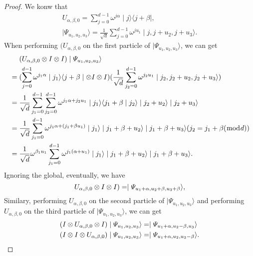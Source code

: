 \documentclass[pdflatex,sn-mathphys]{sn-jnl}%
\theoremstyle{thmstyleone}%
\theoremstyle{thmstyletwo}%
\theoremstyle{thmstylethree}%
\begin{document}
\begin{proof}
    We konw that
\begin{gather*}
U_{{\alpha},{\beta},{0}}=\sum_{j=0}^{d-1} \omega^{j{\alpha}}\mid{j}\rangle\langle{j+\beta}\mid, \\
\mid\varPsi_{{u_1},{u_2},{u_3}}\rangle=\frac{1}{\sqrt{d}}\sum_{j=0}^{d-1} \omega^{j{u_1}}\mid{j,j+{u_2,j+u_3}}\rangle.
\end{gather*}
When performing $(U_{{\alpha},{\beta},{0}}$ on the first particle of $\mid\varPsi_{{u_1},{u_2},{u_3}}\rangle$, we can get 
\begin{align}
&\mathrel{\phantom{=}}
    (U_{{\alpha},{\beta},{0}}\otimes I \otimes I)\mid\varPsi_{{u_1},{u_2},{u_3}}\rangle \notag \\
&=(\sum_{j=0}^{d-1} \omega^{j_1{\alpha}}\mid{j_1}\rangle\langle{j+\beta}\mid\otimes I \otimes I)(\frac{1}{\sqrt{d}}\sum_{j_2=0}^{d-1} \omega^{{j_2}{u_1}}\mid{j_2,j_2+u_2,j_2+u_3}\rangle) \notag \\
&=\frac{1}{\sqrt{d}}\sum_{j_1=0}^{d-1}\sum_{j_2=0}^{d-1}\omega^{{j_1}\alpha+{j_2}{u_1}}\mid{j_1}\rangle\langle{j_1+\beta}\mid{j_2}\rangle\mid{j_2+u_2}\rangle\mid{j_2+u_3}\rangle \notag \\
&=\frac{1}{\sqrt{d}}\sum_{j_1=0}^{d-1}\omega^{{j_1}\alpha+({j_1+\beta}{u_1})}\mid{j_1}\rangle\mid{j_1+\beta+u_2}\rangle\mid{j_1+\beta+u_3}\rangle (j_2=j_1+\beta (\bmod{d}))\notag \\
&=\frac{1}{\sqrt{d}} \omega^{{\beta_1}{u_1}}\sum_{j_1=0}^{d-1}\omega^{{j_1}(\alpha+{u_1})}\mid{j_1}\rangle\mid{j_1+\beta+u_2}\rangle\mid{j_1+\beta+u_3}\rangle. \notag
\end{align} 
Ignoring the global, eventually, we have
\begin{equation}
U_{{\alpha},{\beta},{0}}\otimes I \otimes I) =\mid\varPsi_{{u_1+\alpha},{u_2+\beta},{u_3+\beta}}\rangle, \notag
\end{equation}
Similary, performing $U_{{\alpha},{\beta},{0}}$ on the second particle of $\mid\varPsi_{{u_1},{u_2},{u_3}}\rangle$ and performing $U_{{\alpha},{\beta},{0}}$ on the third particle of $\mid\varPsi_{{u_1},{u_2},{u_3}}\rangle$, we can get
\begin{align}
    (I \otimes U_{{\alpha},{\beta},{0}} \otimes I)\mid\varPsi_{{u_1},{u_2},{u_3}}\rangle &=\mid\varPsi_{{u_1+\alpha},{u_2-\beta},{u_3}}\rangle \notag\\
    (I \otimes I \otimes U_{{\alpha},{\beta},{0}})\mid\varPsi_{{u_1},{u_2},{u_3}}\rangle &=\mid\varPsi_{{u_1+\alpha},{u_2},{u_3-\beta}}\rangle. \notag
\end{align} 
\end{proof}
\end{document}

